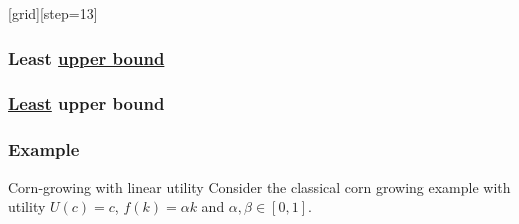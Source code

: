 \documentclass[aspectratio=169]{beamer}
\begin{document}
{
[grid][step=13]

\begin{frame}
\frametitle{Least \underline{upper bound}}
\end{frame}

\begin{frame}
\frametitle{\underline{Least} upper bound}
\end{frame}

\begin{frame}[t]
\frametitle{Example}
\begin{block}{Corn-growing with linear utility}
Consider the classical corn growing example with utility $U(c)=c$, $f(k)=\alpha k$ and $\alpha,\beta \in [0,1]$.
\end{block}
\end{frame}

}
\end{document}
